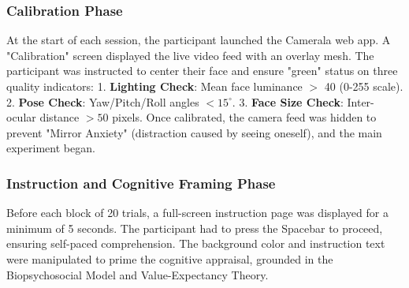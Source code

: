 \documentclass[journal]{IEEEtran}
\begin{document}
\subsubsection{Calibration Phase}
At the start of each session, the participant launched the Camerala web app. A "Calibration" screen displayed the live video feed with an overlay mesh.
The participant was instructed to center their face and ensure "green" status on three quality indicators:
1. \textbf{Lighting Check}: Mean face luminance $>$ 40 (0-255 scale).
2. \textbf{Pose Check}: Yaw/Pitch/Roll angles  $< 15^\circ$.
3. \textbf{Face Size Check}: Inter-ocular distance $> 50$ pixels.
Once calibrated, the camera feed was hidden to prevent "Mirror Anxiety" (distraction caused by seeing oneself), and the main experiment began.

\subsubsection{Instruction and Cognitive Framing Phase}
Before each block of 20 trials, a full-screen instruction page was displayed for a minimum of 5 seconds.
The participant had to press the Spacebar to proceed, ensuring self-paced comprehension.
The background color and instruction text were manipulated to prime the cognitive appraisal, grounded in the Biopsychosocial Model and Value-Expectancy Theory.
\end{document}

